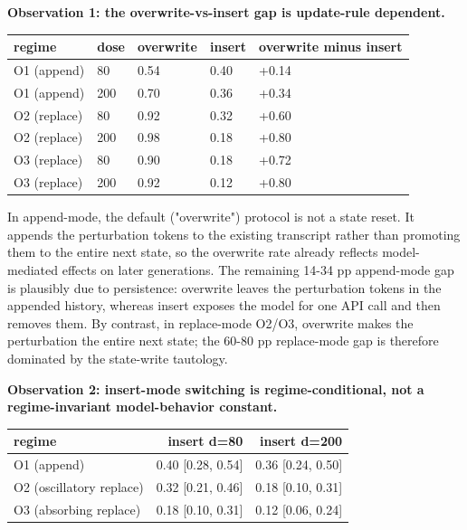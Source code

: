 \documentclass{article}
\theoremstyle{plain}
\theoremstyle{definition}
\begin{document}
\begin{savenotes}
\begin{figure}[h!]
\end{figure}
\end{savenotes}

\textbf{Observation 1: the overwrite-vs-insert gap is update-rule dependent.}

\begin{table}[h!]
\centering
\small
\begin{tabularx}{\textwidth}{lYYYY}
\toprule
regime & dose & overwrite & insert & overwrite minus insert \\
\midrule
O1 (append) & 80 & 0.54 & 0.40 & +0.14 \\
O1 (append) & 200 & 0.70 & 0.36 & +0.34 \\
O2 (replace) & 80 & 0.92 & 0.32 & +0.60 \\
O2 (replace) & 200 & 0.98 & 0.18 & +0.80 \\
O3 (replace) & 80 & 0.90 & 0.18 & +0.72 \\
O3 (replace) & 200 & 0.92 & 0.12 & +0.80 \\
\bottomrule
\end{tabularx}
\end{table}

In append-mode, the default ("overwrite") protocol is not a state reset. It appends the perturbation tokens to the existing transcript rather than promoting them to the entire next state, so the overwrite rate already reflects model-mediated effects on later generations. The remaining 14-34 pp append-mode gap is plausibly due to persistence: overwrite leaves the perturbation tokens in the appended history, whereas insert exposes the model for one API call and then removes them. By contrast, in replace-mode O2/O3, overwrite makes the perturbation the entire next state; the 60-80 pp replace-mode gap is therefore dominated by the state-write tautology.

\textbf{Observation 2: insert-mode switching is regime-conditional, not a regime-invariant model-behavior constant.}

\begin{table}[h!]
\centering
\small
\begin{tabular}{lrr}
\toprule
regime & insert d=80 & insert d=200 \\
\midrule
O1 (append) & 0.40 [0.28, 0.54] & 0.36 [0.24, 0.50] \\
O2 (oscillatory replace) & 0.32 [0.21, 0.46] & 0.18 [0.10, 0.31] \\
O3 (absorbing replace) & 0.18 [0.10, 0.31] & 0.12 [0.06, 0.24] \\
\bottomrule
\end{tabular}
\end{table}
\end{document}
